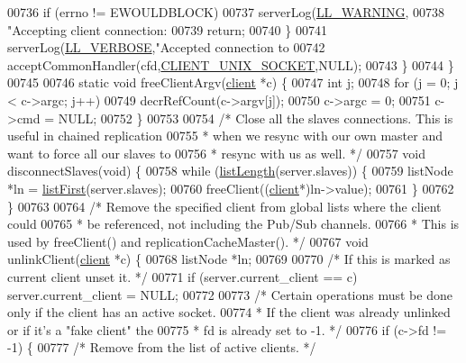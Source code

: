 \begin{DoxyCode}
{{{{{{{00736             \textcolor{keywordflow}{if} (errno != EWOULDBLOCK)
00737                 serverLog(\hyperlink{server_8h_a31229b9334bba7d6be2a72970967a14b}{LL\_WARNING},
00738                     \textcolor{stringliteral}{"Accepting client connection: %
00739             \textcolor{keywordflow}{return};
00740         \}
00741         serverLog(\hyperlink{server_8h_a479b60032f8da6d8ad72e1a9d0809950}{LL\_VERBOSE},\textcolor{stringliteral}{"Accepted connection to %
00742         acceptCommonHandler(cfd,\hyperlink{server_8h_ae19f45757ef3ffb2f3abb86cbc3b67a2}{CLIENT\_UNIX\_SOCKET},NULL);
00743     \}
00744 \}
00745 
00746 \textcolor{keyword}{static} \textcolor{keywordtype}{void} freeClientArgv(\hyperlink{structclient}{client} *c) \{
00747     \textcolor{keywordtype}{int} j;
00748     \textcolor{keywordflow}{for} (j = 0; j < c->argc; j++)
00749         decrRefCount(c->argv[j]);
00750     c->argc = 0;
00751     c->cmd = NULL;
00752 \}
00753 
00754 \textcolor{comment}{/* Close all the slaves connections. This is useful in chained replication}
00755 \textcolor{comment}{ * when we resync with our own master and want to force all our slaves to}
00756 \textcolor{comment}{ * resync with us as well. */}
00757 \textcolor{keywordtype}{void} disconnectSlaves(\textcolor{keywordtype}{void}) \{
00758     \textcolor{keywordflow}{while} (\hyperlink{adlist_8h_afde0ab079f934670e82119b43120e94b}{listLength}(server.slaves)) \{
00759         listNode *ln = \hyperlink{adlist_8h_aa8dc514bbe217bb2e87c1c77cfa84690}{listFirst}(server.slaves);
00760         freeClient((\hyperlink{structclient}{client}*)ln->value);
00761     \}
00762 \}
00763 
00764 \textcolor{comment}{/* Remove the specified client from global lists where the client could}
00765 \textcolor{comment}{ * be referenced, not including the Pub/Sub channels.}
00766 \textcolor{comment}{ * This is used by freeClient() and replicationCacheMaster(). */}
00767 \textcolor{keywordtype}{void} unlinkClient(\hyperlink{structclient}{client} *c) \{
00768     listNode *ln;
00769 
00770     \textcolor{comment}{/* If this is marked as current client unset it. */}
00771     \textcolor{keywordflow}{if} (server.current\_client == c) server.current\_client = NULL;
00772 
00773     \textcolor{comment}{/* Certain operations must be done only if the client has an active socket.}
00774 \textcolor{comment}{     * If the client was already unlinked or if it's a "fake client" the}
00775 \textcolor{comment}{     * fd is already set to -1. */}
00776     \textcolor{keywordflow}{if} (c->fd != -1) \{
00777         \textcolor{comment}{/* Remove from the list of active clients. */}
}}}}}}}}}
\end{DoxyCode}
